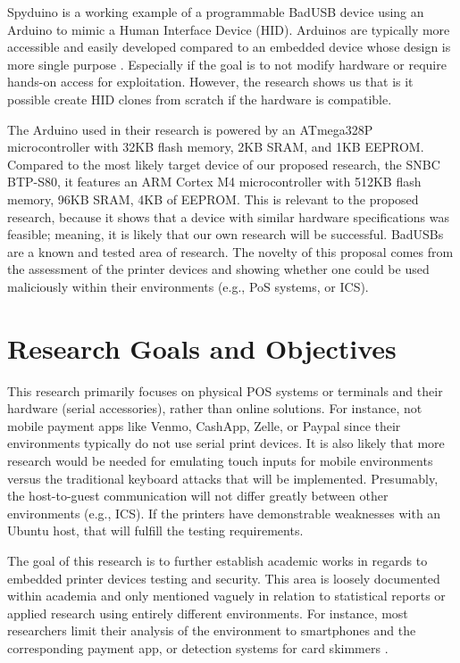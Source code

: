 Spyduino is \autocite{karystinosSpyduinoArduinoHID2019} a working example of a programmable BadUSB device using an Arduino to mimic a Human Interface Device (HID). Arduinos are typically more accessible and easily developed compared to an embedded device whose design is more single purpose \autocite{griffithsECIAIR2019European2019,patnaikpatnaikuniComparativeStudyArduino2017}. Especially if the goal is to not modify hardware or require hands-on access for exploitation. However, the research shows us that is it possible create HID clones from scratch if the hardware is compatible.

The Arduino used in their research is powered by an ATmega328P microcontroller with 32KB flash memory, 2KB SRAM, and 1KB EEPROM. Compared to the most likely target device of our proposed research, the SNBC BTP-S80, it features an ARM Cortex M4 microcontroller with 512KB flash memory, 96KB SRAM, 4KB of EEPROM. This is relevant to the proposed research, because it shows that a device with similar hardware specifications was feasible; meaning, it is likely that our own research will be successful. BadUSBs are a known and tested area of research. The novelty of this proposal comes from the assessment of the printer devices and showing whether one could be used maliciously within their environments (e.g., PoS systems, or ICS).

\section{Research Goals and Objectives}  \label{researchgoalsobjectives}

This research primarily focuses on physical POS systems or terminals and their hardware (serial accessories), rather than online solutions. For instance, not mobile payment apps like Venmo, CashApp, Zelle, or Paypal \autocite{wangMobilePaymentSecurity2016} since their environments typically do not use serial print devices. It is also likely that more research would be needed for emulating touch inputs for mobile environments versus the traditional keyboard attacks that will be implemented. Presumably, the host-to-guest communication will not differ greatly
between other environments (e.g., ICS). If the printers have demonstrable weaknesses with an Ubuntu host, that will fulfill the testing requirements.

The goal of this research is to further establish academic works in regards to embedded printer devices testing and security. This area is loosely documented within academia and only mentioned vaguely in relation to statistical reports or applied research using entirely different environments. For instance, most researchers limit their analysis of the environment to smartphones and the corresponding payment app, or detection systems for card skimmers \autocite{scaifeFearReaperCharacterization2018}.

